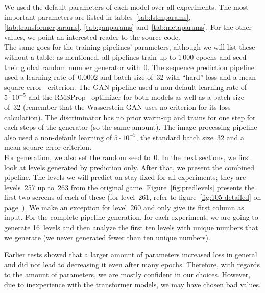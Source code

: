 We used the default parameters of each model over all experiments. The
most important parameters are listed in tables~\ref{tab:lstmparams},
\ref{tab:transformerparams}, \ref{tab:ganparams}
and~\ref{tab:metaparams}. For the other values, we point an interested
reader to the source code. \\
The same goes for the training pipelines' parameters, although we will
list these without a table: as mentioned, all pipelines train up to
1\,000 epochs and seed their global random number generator with~0.
The sequence prediction pipeline used a learning rate of~0.0002 and
batch size of~32 with ``hard'' loss and a mean square
error~\cite{MeanSquaredError2019} criterion. The GAN pipeline used a
non-default learning rate of $5 \cdot 10^{-5}$ and the
RMSProp~\cite{tielemannNeuralNetworksMachine2012} optimizer for both
models as well as a batch size of~32 (remember that the Wasserstein
GAN uses no criterion for its loss calculation). The discriminator has
no prior warm-up and trains for one step for each steps of the
generator (so the same amount). The image processing pipeline also
used a non-default learning of $5 \cdot 10^{-5}$, the standard
batch size~32 and a mean square error criterion. \\
For generation, we also set the random seed to~0. In the next
sections, we first look at levels generated by prediction only. After
that, we present the combined pipeline. The levels we will predict on
stay fixed for all experiments; they are levels~257 up to~263 from the
original game. Figure~\ref{fig:predlevels} presents the first two
screens of each of these (for level~261, refer to
figure~\ref{fig:105-detailed} on page~\pageref{fig:105-detailed}). We
make an exception for level~260 and only give its first column as
input. For the complete pipeline generation, for each experiment, we
are going to generate 16~levels and then analyze the first ten levels
with unique numbers that we generate (we never generated fewer than
ten unique numbers).

Earlier tests showed that a larger amount of parameters increased loss
in general and did not lead to decreasing it even after many epochs.
Therefore, with regards to the amount of parameters, we are mostly
confident in our choices. However, due to inexperience with the
transformer models, we may have chosen bad values.

